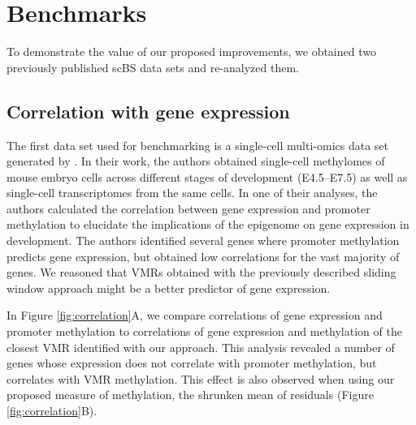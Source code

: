 \documentclass[twocolumn,10pt]{article}
\begin{document}
\section{Benchmarks} %

To demonstrate the value of our proposed improvements, we obtained two previously published scBS data sets and re-analyzed them.

\subsection{Correlation with gene expression}

The first data set used for benchmarking is a single-cell multi-omics data set generated by \citet{argelaguet2019gastru}.
In their work, the authors obtained single-cell methylomes of mouse embryo cells across different stages of development (E4.5--E7.5) as well as single-cell transcriptomes from the same cells.
In one of their analyses, the authors calculated the correlation between gene expression and promoter methylation to elucidate the implications of the epigenome on gene expression in development.
The authors identified several genes where promoter methylation predicts gene expression, but obtained low correlations for the vast majority of genes.
We reasoned that VMRs obtained with the previously described sliding window approach might be a better predictor of gene expression.


In Figure \ref{fig:correlation}A, we compare correlations of gene expression and promoter methylation to correlations of gene expression and methylation of the closest VMR identified with our approach.
This analysis revealed a number of genes whose expression does not correlate with promoter methylation, but correlates with VMR methylation.
This effect is also observed when using our proposed measure of methylation, the shrunken mean of residuals (Figure \ref{fig:correlation}B).
\end{document}
